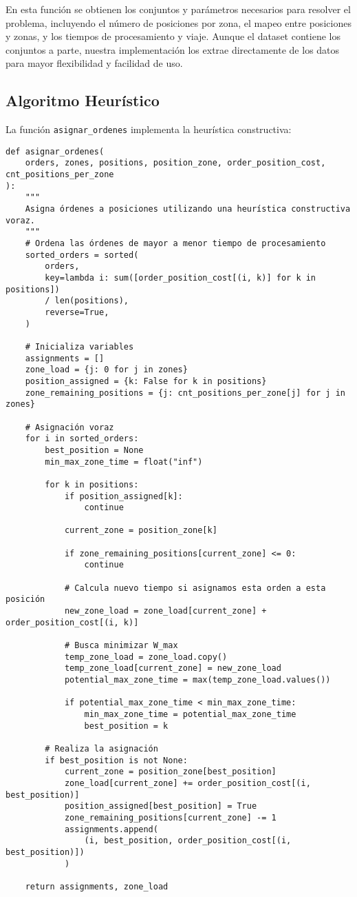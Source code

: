 \documentclass{hw-template}
\begin{document}
En esta función se obtienen los conjuntos y parámetros necesarios para resolver el problema, incluyendo el número de posiciones por zona, el mapeo entre posiciones y zonas, y los tiempos de procesamiento y viaje. Aunque el dataset contiene los conjuntos a parte, nuestra implementación los extrae directamente de los datos para mayor flexibilidad y facilidad de uso.

\subsection{Algoritmo Heurístico}

La función \texttt{asignar\_ordenes} implementa la heurística constructiva:

\begin{verbatim}
def asignar_ordenes(
    orders, zones, positions, position_zone, order_position_cost, cnt_positions_per_zone
):
    """
    Asigna órdenes a posiciones utilizando una heurística constructiva voraz.
    """
    # Ordena las órdenes de mayor a menor tiempo de procesamiento
    sorted_orders = sorted(
        orders,
        key=lambda i: sum([order_position_cost[(i, k)] for k in positions])
        / len(positions),
        reverse=True,
    )

    # Inicializa variables
    assignments = []
    zone_load = {j: 0 for j in zones}
    position_assigned = {k: False for k in positions}
    zone_remaining_positions = {j: cnt_positions_per_zone[j] for j in zones}

    # Asignación voraz
    for i in sorted_orders:
        best_position = None
        min_max_zone_time = float("inf")

        for k in positions:
            if position_assigned[k]:
                continue

            current_zone = position_zone[k]

            if zone_remaining_positions[current_zone] <= 0:
                continue

            # Calcula nuevo tiempo si asignamos esta orden a esta posición
            new_zone_load = zone_load[current_zone] + order_position_cost[(i, k)]

            # Busca minimizar W_max
            temp_zone_load = zone_load.copy()
            temp_zone_load[current_zone] = new_zone_load
            potential_max_zone_time = max(temp_zone_load.values())

            if potential_max_zone_time < min_max_zone_time:
                min_max_zone_time = potential_max_zone_time
                best_position = k

        # Realiza la asignación
        if best_position is not None:
            current_zone = position_zone[best_position]
            zone_load[current_zone] += order_position_cost[(i, best_position)]
            position_assigned[best_position] = True
            zone_remaining_positions[current_zone] -= 1
            assignments.append(
                (i, best_position, order_position_cost[(i, best_position)])
            )

    return assignments, zone_load
\end{verbatim}
\end{document}
